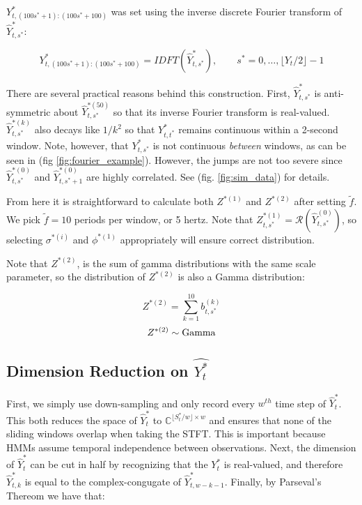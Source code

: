 $Y^*_{t,(100s^*+1):(100s^*+100)}$ was set using the inverse discrete Fourier transform of $\hat{Y}^*_{t,s^*}$:

$$Y^*_{t,(100s^*+1):(100s^*+100)} = IDFT\left(\hat{Y}^*_{t,s^*}\right), \qquad s^* = 0,\ldots,\lfloor Y_t/2 \rfloor - 1$$

There are several practical reasons behind this construction. First, $\hat{Y}^*_{t,s^*}$ is anti-symmetric about $\hat{Y}^{*(50)}_{t,s^*}$ so that its inverse Fourier transform is real-valued. $\hat{Y}^{*(k)}_{t,s^*}$ also decays like $1/k^2$ so that $Y^*_{t,t^*}$ remains continuous within a 2-second window. Note, however, that $Y^*_{t,s^*}$ is not continuous \textit{between} windows, as can be seen in (fig \ref{fig:fourier_example}). However, the jumps are not too severe since $\hat{Y}^{*(0)}_{t,s^*}$ and $\hat{Y}^{*(0)}_{t,s^*+1}$ are highly correlated. See (fig. \ref{fig:sim_data}) for details.

From here it is straightforward to calculate both $Z^{*(1)}$ and $Z^{*(2)}$ after setting $\tilde{f}$. We pick $\tilde{f} = 10$ periods per window, or 5 hertz. Note that $Z^{*(1)}_{t,s^*} = \mathcal{R}\left(\hat{Y}^{(0)}_{t,s^*}\right)$, so selecting $\sigma^{*(i)}$ and $\phi^{*(1)}$ appropriately will ensure correct distribution. 

Note that $Z^{*(2)}$, is the sum of gamma distributions with the same scale parameter, so the distribution of $Z^{*(2)}$ is also a Gamma distribution:

$$Z^{*(2)} = \sum_{k=1}^{10} b^{(k)}_{t,s^*}$$
$$Z^{*(2)} \sim {\rm{Gamma}}$$


























\iffalse


\subsection{Dimension Reduction on $\hat{Y_t^*}$}

First, we simply use down-sampling and only record every $w^{th}$ time step of $\hat{Y}_t^*$. This both reduces the space of $\hat{Y}_t^*$ to $\mathbb{C}^{\lfloor S^*_t / w \rfloor \times w}$ and ensures that none of the sliding windows overlap when taking the STFT. This is important because HMMs assume temporal independence between observations. Next, the dimension of $\hat{Y}_t^*$ can be cut in half by recognizing that the $Y_t^*$ is real-valued, and therefore $\hat{Y}_{t,k}^*$ is equal to the complex-congugate of $\hat{Y}_{t,w-k-1}^*$. Finally, by Parseval's Thereom we have that:

